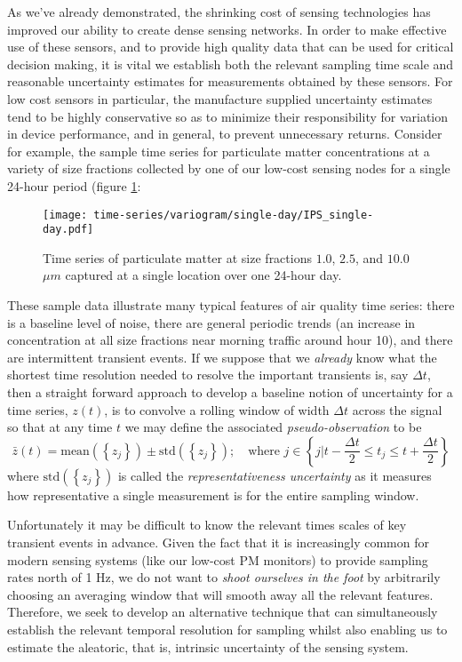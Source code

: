 As we've already demonstrated, the shrinking cost of sensing technologies has improved our ability to create dense sensing networks. In order to make effective use of these sensors, and to provide high quality data that can be used for critical decision making, it is vital we establish both the relevant sampling time scale and reasonable uncertainty estimates for measurements obtained by these sensors. For low cost sensors in particular, the manufacture supplied uncertainty estimates tend to be highly conservative so as to minimize their responsibility for variation in device performance, and in general, to prevent unnecessary returns. Consider for example, the sample time series for particulate matter concentrations at a variety of size fractions collected by one of our low-cost sensing nodes for a single 24-hour period (figure \ref{fig:pm-single-day}:
\begin{figure}[h]
  \centering
  \texttt{[image: time-series/variogram/single-day/IPS\_single-day.pdf]}
  \caption{Time series of particulate matter at size fractions $1.0$, $2.5$, and $10.0$ $\mu m$ captured at a single location over one 24-hour day.}
  \label{fig:pm-single-day}
\end{figure}
These sample data illustrate many typical features of air quality time series: there is a baseline level of noise, there are general periodic trends (an increase in concentration at all size fractions near morning traffic around hour 10), and there are intermittent transient events. If we suppose that we \textit{already} know what the shortest time resolution needed to resolve the important transients is, say $\Delta t$, then a straight forward approach to develop a baseline notion of uncertainty for a time series, $z(t)$, is to convolve a rolling window of width $\Delta t$ across the signal so that at any time $t$ we may define the associated \textit{pseudo-observation} to be
\begin{equation}
  \bar{z}(t) = \text{mean}\left(\left\{z_j \right\}\right) \pm \text{std}\left(\left\{z_j \right\}\right); \quad \text{where } j \in \left\{ \left. j \right\vert t - \frac{\Delta t}{2} \leq t_j  \leq t + \frac{\Delta t}{2}\right\}
\end{equation}
where $\text{std}\left(\left\{z_j\right\}\right)$ is called the \textit{representativeness uncertainty} as it measures how representative a single measurement is for the entire sampling window.

Unfortunately it may be difficult to know the relevant times scales of key transient events in advance. Given the fact that it is increasingly common for modern sensing systems (like our low-cost PM monitors) to provide sampling rates north of 1 Hz, we do not want to \textit{shoot ourselves in the foot} by arbitrarily choosing an averaging window that will smooth away all the relevant features. Therefore, we seek to develop an alternative technique that can simultaneously establish the relevant temporal resolution for sampling whilst also enabling us to estimate the aleatoric, that is, intrinsic uncertainty of the sensing system.

